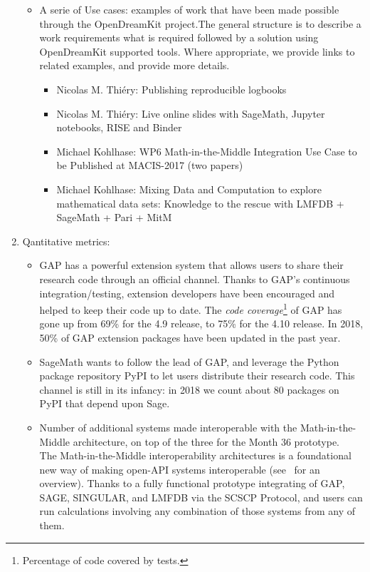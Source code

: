 \begin{enumerate}
\begin{itemize}
\item A serie of Use cases: examples of work that have been made possible through the OpenDreamKit project.The general structure is to 
describe a work requirements what is required followed by a solution using OpenDreamKit supported tools. Where appropriate, we provide links 
to related examples, and provide more details.

\begin{itemize}     
4 use cases: %
\item Nicolas M. Thiéry: Publishing reproducible logbooks 
\item Nicolas M. Thiéry: Live online slides with SageMath, Jupyter notebooks, RISE and Binder
\item Michael Kohlhase: WP6 Math-in-the-Middle Integration Use Case to be Published at MACIS-2017 (two papers) 
\item Michael Kohlhase: Mixing Data and Computation to explore mathematical data sets: Knowledge to the rescue with LMFDB + SageMath + Pari + MitM 
\end{itemize}        
\end{itemize} 
\item Qantitative metrics:
  \begin{itemize}
  \item GAP has a powerful extension system that allows users to share
    their research code through an official channel. Thanks to GAP's
    continuous integration/testing, extension developers have been
    encouraged and helped to keep their code up to date. The
    \emph{code coverage}\footnote{Percentage of code covered by
      tests.} of GAP has gone up from 69\% for the 4.9 release, to
    75\% for the 4.10 release. In 2018, 50\% of GAP extension packages
    have been updated in the past year.
  \item SageMath wants to follow the lead of GAP, and leverage the
    Python package repository PyPI to let users distribute their
    research code. This channel is still in its infancy: in 2018 we
    count about 80 packages on PyPI that depend upon Sage.
        

    \item Number of additional systems made interoperable with the Math-in-the-Middle
      architecture, on top of the three for the Month 36 prototype.\\
      The Math-in-the-Middle interoperability architectures is a foundational new way of
      making open-API systems interoperable (see~\cite{ODK-D6.5} for an overview). Thanks
      to a fully functional prototype integrating of GAP, SAGE, SINGULAR, and LMFDB via
      the SCSCP Protocol, and users can run calculations involving any combination of
      those systems from any of them.


\end{itemize}
\end{enumerate}
